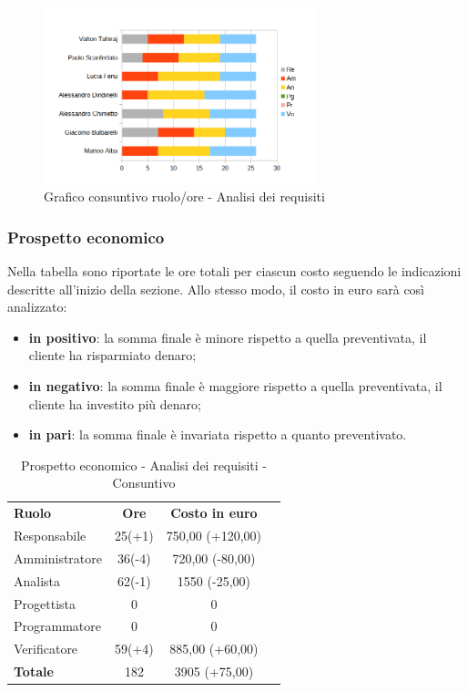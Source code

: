 	\begin{figure} [h!]
	\centering
	\includegraphics[width=0.7\textwidth]{res/img/grafici/consuntivo-barre_ ore analisi requisiti.png}
	\caption{Grafico consuntivo ruolo/ore - Analisi dei requisiti} 
\end{figure}


\newpage
\subsubsection{Prospetto economico}
Nella tabella sono riportate le ore totali per ciascun costo seguendo le indicazioni descritte all'inizio della sezione.
Allo stesso modo, il costo in euro sarà così analizzato:
\begin{itemize}
	\item {\bfseries in positivo}: la somma finale è minore rispetto a quella preventivata, il cliente ha risparmiato denaro;
	\item {\bfseries in negativo}: la somma finale è maggiore rispetto a quella preventivata, il cliente ha investito più denaro;
	\item {\bfseries in pari}: la somma finale è invariata rispetto a quanto preventivato. \\
\end{itemize}
\begin{table} [h!]
	\begin{center}
		\begin{tabular} { m{3 cm} c c c  }
			\rowcolor{lightgray}
			\textbf{Ruolo} & \textbf{Ore} & \textbf{Costo in euro} \\
			Responsabile & 25(+1) & 750,00 (+120,00) \\
			Amministratore & 36(-4) & 720,00 (-80,00)  \\
			Analista & 62(-1) & 1550 (-25,00) \\
			Progettista & 0 & 0 \\
			Programmatore & 0 & 0  \\
			Verificatore & 59(+4) & 885,00 (+60,00)  \\
			\textbf{Totale} & 182  & 3905 (+75,00) \\
			
		\end{tabular}
		\caption{Prospetto economico - Analisi dei requisiti - Consuntivo}
	\end{center}
\end{table}

